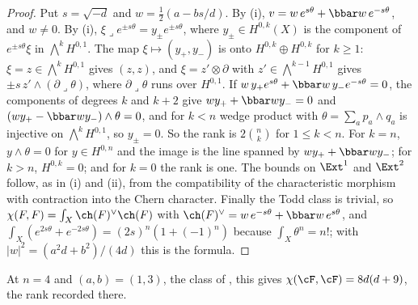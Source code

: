 \begin{proof}
Put $s=\sqrt{-d}$ and $w=\frac12(a-bs/d)$. By (i),
$v=w\,e^{s\theta}+\bbar w\,e^{-s\theta}$, and $w\ne0$. By
(i), $\xi\lrcorner e^{\pm s\theta}=y_{\pm}e^{\pm s\theta}$,
where $y_{\pm}\in H^{0,k}(X)$ is the component of $e^{\pm s\theta}\xi$ in
$\bigwedge^{k}H^{0,1}$. The map $\xi\mapsto(y_{+},y_{-})$ is onto
$H^{0,k}\oplus H^{0,k}$ for $k\ge1$: $\xi=z\in\bigwedge^{k}H^{0,1}$ gives
$(z,z)$, and $\xi=z'\otimes\partial$ with $z'\in\bigwedge^{k-1}H^{0,1}$ gives
$\pm s\,z'\wedge(\partial\lrcorner\theta)$, where $\partial\lrcorner\theta$ runs
over $H^{0,1}$. If $w\,y_{+}e^{s\theta}+\bbar w\,y_{-}e^{-s\theta}=0$, the
components of degrees $k$ and $k+2$ give $wy_{+}+\bbar wy_{-}=0$ and
$(wy_{+}-\bbar wy_{-})\wedge\theta=0$, and for $k<n$ wedge product with
$\theta=\sum_{a}p_{a}\wedge q_{a}$ is injective on $\bigwedge^{k}H^{0,1}$, so
$y_{\pm}=0$. So the rank is $2\binom{n}{k}$ for $1\le k<n$. For $k=n$,
$y\wedge\theta=0$ for $y\in H^{0,n}$ and the image is the line spanned by
$wy_{+}+\bbar wy_{-}$; for $k>n$, $H^{0,k}=0$; and for $k=0$ the rank is one.
The bounds on $\Ext^{1}$ and $\Ext^{2}$ follow, as in (i)
and (ii), from the compatibility of the characteristic morphism with
contraction into the Chern character. Finally the Todd class
is trivial, so $\chi(F,F)=\int_{X}\ch(F)^{\vee}\ch(F)$ with
$\ch(F)^{\vee}=w\,e^{-s\theta}+\bbar w\,e^{s\theta}$, and
$\int_{X}(e^{2s\theta}+e^{-2s\theta})=(2s)^{n}(1+(-1)^{n})$ because
$\int_{X}\theta^{n}=n!$; with $|w|^{2}=(a^{2}d+b^{2})/(4d)$ this is the
formula.
\end{proof}

At $n=4$ and $(a,b)=(1,3)$, the class of , this gives
$\chi(\cF,\cF)=8d(d+9)$, the rank recorded there.

